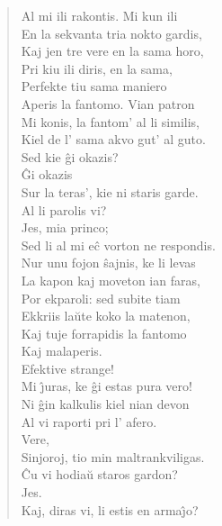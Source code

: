 \begin{verse}
                Al mi ili rakontis. Mi kun ili\\
                En la sekvanta tria nokto gardis,\\
                Kaj jen tre vere en la sama horo,\\
                Pri kiu ili diris, en la sama,\\
                Perfekte tiu sama maniero\\
                Aperis la fantomo. Vian patron\\
                Mi konis, la fantom' al li similis,\\
                Kiel de l' sama akvo gut' al guto.\\
 Sed kie \^gi okazis?\\
 \^Gi okazis\\
                Sur la teras', kie ni staris garde.\\
Al li parolis vi?\\
 Jes, mia princo;\\
                Sed li al mi e\^c vorton ne respondis.\\
                Nur unu fojon \^sajnis, ke li levas\\
                La kapon kaj moveton ian faras,\\
                Por ekparoli: sed subite tiam\\
                Ekkriis la\u ute koko la matenon,\\
                Kaj tuje forrapidis la fantomo\\
                Kaj malaperis.\\
 Efektive strange!\\
 Mi \^{\j}uras, ke \^gi estas pura vero!\\
                Ni \^gin kalkulis kiel nian devon\\
                Al vi raporti pri l' afero.\\
 Vere,\\
                Sinjoroj, tio min maltrankviligas.\\
                \^Cu vi hodia\u u staros gardon?\\
 Jes.\\
 Kaj, diras vi, li estis en arma\^{\j}o?\\

\end{verse}
